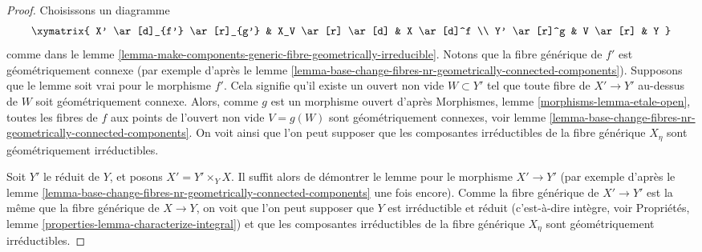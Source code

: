 \begin{proof}
Choisissons un diagramme
$$
\xymatrix{
X' \ar[d]_{f'} \ar[r]_{g'} & X_V \ar[r] \ar[d] & X \ar[d]^f \\
Y' \ar[r]^g & V \ar[r] & Y
}
$$
comme dans le
lemme \ref{lemma-make-components-generic-fibre-geometrically-irreducible}.
Notons que la fibre générique de $f'$ est géométriquement connexe
(par exemple d'après le
lemme \ref{lemma-base-change-fibres-nr-geometrically-connected-components}).
Supposons que le lemme soit vrai pour le morphisme $f'$. Cela signifie qu'il
existe un ouvert non vide $W \subset Y'$ tel que toute fibre de
$X' \to Y'$ au-dessus de $W$ soit géométriquement connexe.
Alors, comme $g$ est un morphisme ouvert d'après
Morphismes, lemme \ref{morphisms-lemma-etale-open},
toutes les fibres de $f$ aux points de l'ouvert non vide $V = g(W)$ sont
géométriquement connexes, voir
lemme \ref{lemma-base-change-fibres-nr-geometrically-connected-components}.
On voit ainsi que l'on peut supposer que les composantes irréductibles
de la fibre générique $X_\eta$ sont géométriquement irréductibles.

\medskip\noindent
Soit $Y'$ le réduit de $Y$, et posons $X' = Y' \times_Y X$.
Il suffit alors de démontrer le lemme pour le morphisme $X' \to Y'$
(par exemple d'après le
lemme \ref{lemma-base-change-fibres-nr-geometrically-connected-components}
une fois encore). Comme la fibre générique de $X' \to Y'$ est la même que la
fibre générique de $X \to Y$, on voit que l'on peut supposer que $Y$ est
irréductible et réduit (c'est-à-dire intègre, voir
Propriétés, lemme \ref{properties-lemma-characterize-integral})
et que les composantes irréductibles de la fibre générique $X_\eta$
sont géométriquement irréductibles.


\end{proof}
